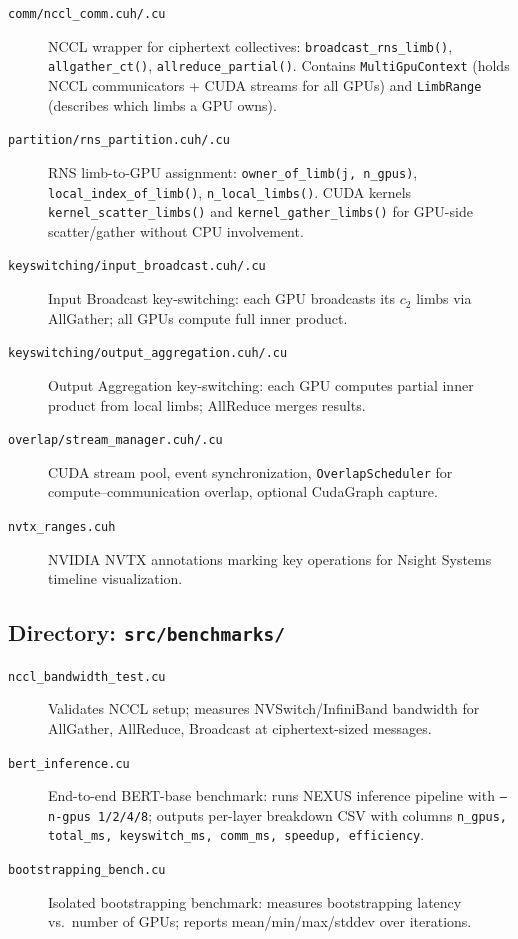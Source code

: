 \documentclass[11pt,letterpaper]{article}
\begin{document}
\begin{description}
  \item[\texttt{comm/nccl\_comm.cuh/.cu}] NCCL wrapper for ciphertext collectives:
    \texttt{broadcast\_rns\_limb()}, \texttt{allgather\_ct()}, \texttt{allreduce\_partial()}.
    Contains \texttt{MultiGpuContext} (holds NCCL communicators + CUDA streams for all GPUs)
    and \texttt{LimbRange} (describes which limbs a GPU owns).
  \item[\texttt{partition/rns\_partition.cuh/.cu}] RNS limb-to-GPU assignment:
    \texttt{owner\_of\_limb(j, n\_gpus)}, \texttt{local\_index\_of\_limb()}, \texttt{n\_local\_limbs()}.
    CUDA kernels \texttt{kernel\_scatter\_limbs()} and \texttt{kernel\_gather\_limbs()} for
    GPU-side scatter/gather without CPU involvement.
  \item[\texttt{keyswitching/input\_broadcast.cuh/.cu}] Input Broadcast key-switching:
    each GPU broadcasts its $c_2$ limbs via AllGather; all GPUs compute full inner product.
  \item[\texttt{keyswitching/output\_aggregation.cuh/.cu}] Output Aggregation key-switching:
    each GPU computes partial inner product from local limbs; AllReduce merges results.
  \item[\texttt{overlap/stream\_manager.cuh/.cu}] CUDA stream pool, event synchronization,
    \texttt{OverlapScheduler} for compute--communication overlap, optional CudaGraph capture.
  \item[\texttt{nvtx\_ranges.cuh}] NVIDIA NVTX annotations marking key operations for
    Nsight Systems timeline visualization.
\end{description}

\subsection{Directory: \texttt{src/benchmarks/}}

\begin{description}
  \item[\texttt{nccl\_bandwidth\_test.cu}] Validates NCCL setup; measures NVSwitch/InfiniBand
    bandwidth for AllGather, AllReduce, Broadcast at ciphertext-sized messages.
  \item[\texttt{bert\_inference.cu}] End-to-end BERT-base benchmark: runs NEXUS inference
    pipeline with \texttt{--n-gpus 1/2/4/8}; outputs per-layer breakdown CSV with columns
    \texttt{n\_gpus, total\_ms, keyswitch\_ms, comm\_ms, speedup, efficiency}.
  \item[\texttt{bootstrapping\_bench.cu}] Isolated bootstrapping benchmark: measures
    bootstrapping latency vs.\ number of GPUs; reports mean/min/max/stddev over iterations.
\end{description}
\end{document}
